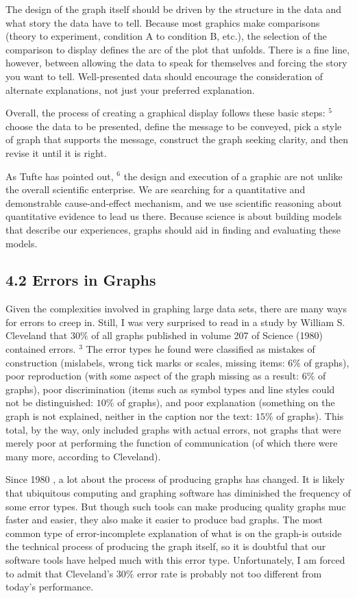 The design of the graph itself should be driven by the structure in the data and what story the data have to tell. Because most graphics make comparisons (theory to experiment, condition A to condition B, etc.), the selection of the comparison to display defines the arc of the plot that unfolds. There is a fine line, however, between allowing the data to speak for themselves and forcing the story you want to tell. Well-presented data should encourage the consideration of alternate explanations, not just your preferred explanation.

Overall, the process of creating a graphical display follows these basic steps: ${ }^{5}$ choose the data to be presented, define the message to be conveyed, pick a style of graph that supports the message, construct the graph seeking clarity, and then revise it until it is right.

As Tufte has pointed out, ${ }^{6}$ the design and execution of a graphic are not unlike the overall scientific enterprise. We are searching for a quantitative and demonstrable cause-and-effect mechanism, and we use scientific reasoning about quantitative evidence to lead us there. Because science is about building models that describe our experiences, graphs should aid in finding and evaluating these models.

\subsection*{4.2 Errors in Graphs}
Given the complexities involved in graphing large data sets, there are many ways for errors to creep in. Still, I was very surprised to read in a study by William S. Cleveland that $30 \%$ of all graphs published in volume 207 of Science (1980) contained errors. ${ }^{3}$ The error types he found were classified as mistakes of construction (mislabels, wrong tick marks or scales, missing items: $6 \%$ of graphs), poor reproduction (with some aspect of the graph missing as a result: $6 \%$ of graphs), poor discrimination (items such as symbol types and line styles could not be distinguished: $10 \%$ of graphs), and poor explanation (something on the graph is not explained, neither in the caption nor the text: $15 \%$ of graphs). This total, by the way, only included graphs with actual errors, not graphs that were merely poor at performing the function of communication (of which there were many more, according to Cleveland).

Since 1980 , a lot about the process of producing graphs has changed. It is likely that ubiquitous computing and graphing software has diminished the frequency of some error types. But though such tools can make producing quality graphs muc faster and easier, they also make it easier to produce bad graphs. The most common type of error-incomplete explanation of what is on the graph-is outside the technical process of producing the graph itself, so it is doubtful that our software tools have helped much with this error type. Unfortunately, I am forced to admit that Cleveland's $30 \%$ error rate is probably not too different from today's performance.

